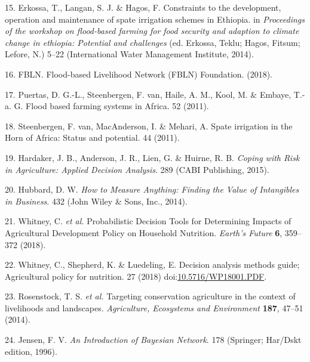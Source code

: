 \documentclass[]{elsarticle} %
\begin{document}
\leavevmode\hypertarget{ref-Erkossa_et_al_2014}{}%
15. Erkossa, T., Langan, S. J. \& Hagos, F. Constraints to the development, operation and maintenance of spate irrigation schemes in Ethiopia. in \emph{Proceedings of the workshop on flood-based farming for food security and adaption to climate change in ethiopia: Potential and challenges} (ed. Erkossa, Teklu; Hagos, Fitsum; Lefore, N.) 5--22 (International Water Management Institute, 2014).

\leavevmode\hypertarget{ref-FBLN_2018}{}%
16. FBLN. Flood-based Livelihood Network (FBLN) Foundation. (2018).

\leavevmode\hypertarget{ref-Puertas_et_al_2011}{}%
17. Puertas, D. G.-L., Steenbergen, F. van, Haile, A. M., Kool, M. \& Embaye, T.-a. G. Flood based farming systems in Africa. 52 (2011).

\leavevmode\hypertarget{ref-VanSteenbergen_et_al_2011}{}%
18. Steenbergen, F. van, MacAnderson, I. \& Mehari, A. Spate irrigation in the Horn of Africa: Status and potential. 44 (2011).

\leavevmode\hypertarget{ref-Hardaker_et_al_2015}{}%
19. Hardaker, J. B., Anderson, J. R., Lien, G. \& Huirne, R. B. \emph{Coping with Risk in Agriculture: Applied Decision Analysis}. 289 (CABI Publishing, 2015).

\leavevmode\hypertarget{ref-Hubbard_2014}{}%
20. Hubbard, D. W. \emph{How to Measure Anything: Finding the Value of Intangibles in Business}. 432 (John Wiley \& Sons, Inc., 2014).

\leavevmode\hypertarget{ref-Whitney_Lanzanova_et_al_2018}{}%
21. Whitney, C. \emph{et al.} Probabilistic Decision Tools for Determining Impacts of Agricultural Development Policy on Household Nutrition. \emph{Earth's Future} \textbf{6}, 359--372 (2018).

\leavevmode\hypertarget{ref-Whitney_Shepherd_et_al_2018}{}%
22. Whitney, C., Shepherd, K. \& Luedeling, E. Decision analysis methods guide; Agricultural policy for nutrition. 27 (2018) doi:\href{https://doi.org/10.5716/WP18001.PDF}{10.5716/WP18001.PDF}.

\leavevmode\hypertarget{ref-Rosenstock_et_al_2014}{}%
23. Rosenstock, T. S. \emph{et al.} Targeting conservation agriculture in the context of livelihoods and landscapes. \emph{Agriculture, Ecosystems and Environment} \textbf{187}, 47--51 (2014).

\leavevmode\hypertarget{ref-Jensen_1996}{}%
24. Jensen, F. V. \emph{An Introduction of Bayesian Network}. 178 (Springer; Har/Dskt edition, 1996).
\end{document}
